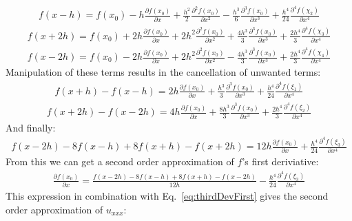 \documentclass[12pt,a4]{article}
\begin{document}
\begin{enumerate}
\begin{align*}
    \end{align*}
    \begin{align*}
      f(x - h) = f(x_0) - h \frac{\partial f(x_0)}{\partial x} + \frac{h^2}{2} \frac{\partial^2 f(x_0)}{\partial x^2} - \frac{h^3}{6} \frac{\partial^3 f(x_0)}{\partial x^3} + \frac{h^4}{24} \frac{\partial^4 f(\chi_2)}{\partial x^4}
    \end{align*}
    \begin{align*}
      f(x + 2 h) = f(x_0) + 2 h \frac{\partial f(x_0)}{\partial x} + 2 h^2 \frac{\partial^2 f(x_0)}{\partial x^2} + \frac{4 h^3}{3} \frac{\partial^3 f(x_0)}{\partial x^3} + \frac{2 h^4}{3} \frac{\partial^4 f(\chi_3)}{\partial x^4}
    \end{align*}
    \begin{align*}
      f(x - 2 h) = f(x_0) - 2 h \frac{\partial f(x_0)}{\partial x} + 2 h^2 \frac{\partial^2 f(x_0)}{\partial x^2} - \frac{4 h^3}{3} \frac{\partial^3 f(x_0)}{\partial x^3} + \frac{2 h^4}{3} \frac{\partial^4 f(\chi_4)}{\partial x^4}
    \end{align*}
    Manipulation of these terms results in the cancellation of unwanted terms:
    \begin{align*}
      f(x + h) - f(x - h) =  2 h \frac{\partial f(x_0)}{\partial x} + \frac{h^3}{3} \frac{\partial^3 f(x_0)}{\partial x^3} + \frac{h^4}{24} \frac{\partial^4 f(\xi_1)}{\partial x^4}
    \end{align*}
    \begin{align*}
      f(x + 2 h) - f(x - 2 h) = 4 h \frac{\partial f(x_0)}{\partial x} + \frac{8 h^3}{3} \frac{\partial^3 f(x_0)}{\partial x^3} + \frac{2 h^4}{3} \frac{\partial^4 f(\xi_2)}{\partial x^4}
    \end{align*}
    And finally:
    \begin{align*}
      f(x - 2 h)- 8 f(x - h) + 8 f(x + h) - f(x + 2 h) =  12 h \frac{\partial f(x_0)}{\partial x} + \frac{h^4}{24} \frac{\partial^4 f(\xi_3)}{\partial x^4}
    \end{align*}
    From this we can get a second order approximation of $f$'s first deriviative:
    \begin{align*}
      \frac{\partial f(x_0)}{\partial x} = \frac{f(x - 2 h)- 8 f(x - h) + 8 f(x + h) - f(x - 2 h)}{12 h} - \frac{h^4}{24} \frac{\partial^4 f(\xi_3)}{\partial x^4}
    \end{align*}
    This expression in combination with Eq.~\ref{eq:thirdDevFirst} gives the second order approximation of $u_{xxx}$:
    \begin{align*}

\end{align*}
\end{enumerate}
\end{document}
